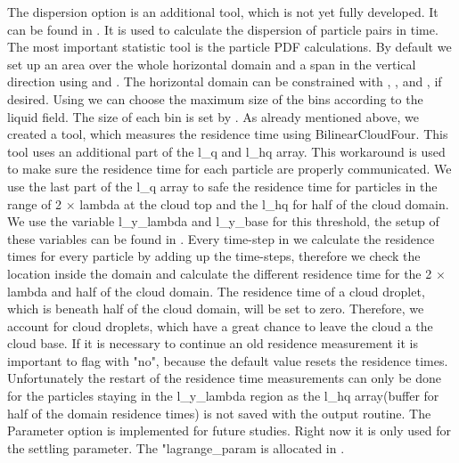 \documentclass[12pt]{article}
\begin{document}
The dispersion option is an additional tool, which is not yet fully developed. It can be found in . It is used to calculate the dispersion of particle pairs in time. \newline
The most important statistic tool is the particle PDF calculations. By default we set up an area over the whole horizontal domain and a span in the vertical direction using  and . The horizontal domain can be constrained with , ,  and , if desired. Using  we can choose the maximum size of the bins according to the liquid field. The size of each bin is set by . \newline
As already mentioned above, we created a tool, which measures the residence time using BilinearCloudFour. This tool uses an additional part of the l\_q and l\_hq array. This workaround is used to make sure the residence time for each particle are properly communicated. We use the last part of the l\_q array to safe the residence time for particles in the range of 2 $\times$ lambda at the cloud top and the l\_hq for half of the cloud domain. We use the variable l\_y\_lambda and l\_y\_base for this threshold, the setup of these variables can be found in . Every time-step in  we calculate the residence times for every particle by adding up the time-steps, therefore we check the location inside the domain and calculate the different residence time for the 2 $\times$ lambda and half of the cloud domain. The residence time of a cloud droplet, which is beneath half of the cloud domain, will be set to zero. Therefore, we account for cloud droplets, which have a great chance to leave the cloud a the cloud base. If it is necessary to continue an old residence measurement it is important to flag  with "no", because the default value resets the residence times. Unfortunately the restart of the residence time measurements can only be done for the particles staying in the l\_y\_lambda region as the l\_hq array(buffer for half of the domain residence times) is not saved with the output routine. \newline
The Parameter option is implemented for future studies. Right now it is only used for the settling parameter. The "lagrange\_param is allocated in .
\end{document}
